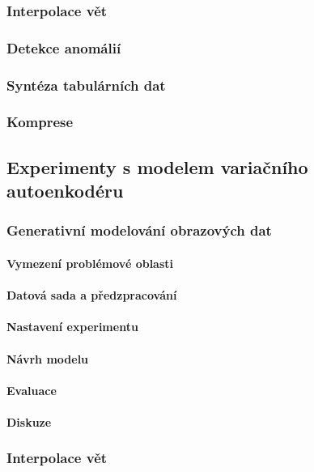 \documentclass[11pt,a4paper]{report}
\begin{document}
\section{Interpolace vět}
\section{Detekce anomálií}
\section{Syntéza tabulárních dat}
\section{Komprese}


\chapter{Experimenty s modelem variačního autoenkodéru}
\section{Generativní modelování obrazových dat}
\subsection{Vymezení problémové oblasti}
\subsection{Datová sada a předzpracování}
\subsection{Nastavení experimentu}
\subsection{Návrh modelu}
\subsection{Evaluace}
\subsection{Diskuze}
\section{Interpolace vět}

{%
\pagestyle{plain}

}




\part*{\Prilohy\thispagestyle{empty}}
\appendix

% 
% 
\end{document}
